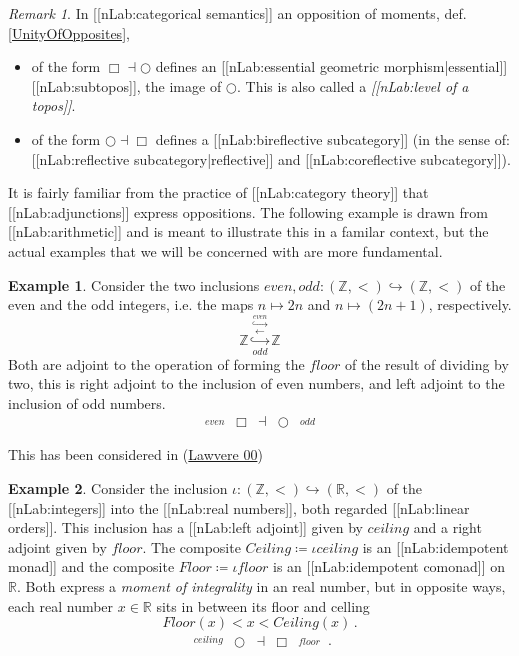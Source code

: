 \documentclass[12pt,titlepage]{article}
\newcommand{\itexarray}[1]{\begin{matrix}#1\end{matrix}}
\newcommand{\lt}{<}
\theoremstyle{plain}
\theoremstyle{definition}
\newtheorem{example}{Example}
\theoremstyle{remark}
\newtheorem{remark}{Remark}
\begin{document}
\begin{remark}
\label{}\hypertarget{}{}
In [[nLab:categorical semantics]] an opposition of moments, def. \ref{UnityOfOpposites},
\begin{itemize}%
\item of the form $\Box \dashv \bigcirc$ defines an [[nLab:essential geometric morphism|essential]] [[nLab:subtopos]], the image of $\bigcirc$. This is also called a \emph{[[nLab:level of a topos]]}.
\item of the form $\bigcirc \dashv \Box$ defines a [[nLab:bireflective subcategory]] (in the sense of: [[nLab:reflective subcategory|reflective]] and [[nLab:coreflective subcategory]]).
\end{itemize}
\end{remark}
It is fairly familiar from the practice of [[nLab:category theory]] that [[nLab:adjunctions]] express oppositions. The following example is drawn from [[nLab:arithmetic]] and is meant to illustrate this in a familar context, but the actual examples that we will be concerned with are more fundamental.
\begin{example}
\label{}\hypertarget{}{}
Consider the two inclusions $even, odd \colon (\mathbb{Z},\lt ) \hookrightarrow (\mathbb{Z},\lt)$ of the even and the odd integers, i.e. the maps $n \mapsto 2 n$ and $n \mapsto (2n+1)$, respectively.
\begin{displaymath}
\mathbb{Z}
  \stackrel{\overset{even}{\hookrightarrow}}{\stackrel{\longleftarrow}{\underset{odd}{\hookrightarrow}}}
  \mathbb{Z}
\end{displaymath}
Both are adjoint to the operation of forming the $floor$ of the result of dividing by two, this is right adjoint to the inclusion of even numbers, and left adjoint to the inclusion of odd numbers.
\begin{displaymath}
\itexarray{
    \stackrel{even}{} & \Box &\dashv& \bigcirc & \stackrel{odd}{}
  }
\end{displaymath}
\end{example}
This has been considered in (\href{http://ncatlab.org/nlab/show/Aufhebung#Law00}{Lawvere 00})
\begin{example}
\label{}\hypertarget{}{}
Consider the inclusion $\iota \colon (\mathbb{Z}, \lt) \hookrightarrow (\mathbb{R}, \lt)$ of the [[nLab:integers]] into the [[nLab:real numbers]], both regarded [[nLab:linear orders]]. This inclusion has a [[nLab:left adjoint]] given by $ceiling$ and a right adjoint given by $floor$. The composite $Ceiling \coloneqq \iota ceiling$ is an [[nLab:idempotent monad]] and the composite $Floor \coloneqq \iota floor$ is an [[nLab:idempotent comonad]] on $\mathbb{R}$. Both express a \emph{moment of integrality} in an real number, but in opposite ways, each real number $x\in \mathbb{R}$ sits in between its floor and celling
\begin{displaymath}
Floor(x) \lt x \lt Ceiling(x)
  \,.
\end{displaymath}
\begin{displaymath}
\itexarray{
     \stackrel{ceiling}{} &\bigcirc &\dashv& \Box & \stackrel{floor}{}
  }
  \,.
\end{displaymath}
\end{example}
\end{document}
